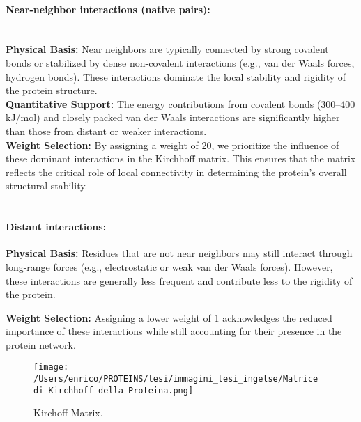 \documentclass[English, Lau, oneside]{sapthesis}
\begin{document}
\paragraph{Near-neighbor interactions (native pairs):} \\
\textbf{Physical Basis:} Near neighbors are typically connected by strong covalent bonds or stabilized by dense non-covalent interactions (e.g., van der Waals forces, hydrogen bonds). These interactions dominate the local stability and rigidity of the protein structure.\\

\textbf{Quantitative Support:} The energy contributions from covalent bonds (300–400 kJ/mol) and closely packed van der Waals interactions are significantly higher than those from distant or weaker interactions.\\

\textbf{Weight Selection:} By assigning a weight of 20, we prioritize the influence of these dominant interactions in the Kirchhoff matrix. This ensures that the matrix reflects the critical role of local connectivity in determining the protein's overall structural stability.\\
\\
\paragraph{Distant interactions:}
\textbf{Physical Basis:} Residues that are not near neighbors may still interact through long-range forces (e.g., electrostatic or weak van der Waals forces). However, these interactions are generally less frequent and contribute less to the rigidity of the protein.

\textbf{Weight Selection:} Assigning a lower weight of 1 acknowledges the reduced importance of these interactions while still accounting for their presence in the protein network.
\begin{figure}[h!]
    \centering
    \texttt{[image: /Users/enrico/PROTEINS/tesi/immagini\_tesi\_ingelse/Matrice di Kirchhoff della Proteina.png]}
    \caption{Kirchoff Matrix.}
\end{figure}
\\\\\\\\\\\\\\
\end{document}

